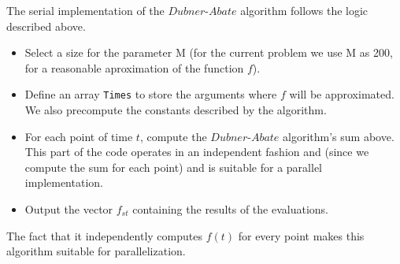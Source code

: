 The serial implementation of the $Dubner$-$Abate$ algorithm follows the logic described above.
\begin{itemize}
\item{Select a size for the parameter M (for the current problem we use M as 200, for a reasonable aproximation of the function $f$).}
\item{Define an array \texttt{Times} to store the arguments where $f$ will be approximated. We also precompute the constants described by the algorithm.}
\item{For each point of time $t$, compute the $Dubner$-$Abate$ algorithm's sum above.
This part of the code operates in an independent fashion and (since we compute the sum for each point) and is suitable for a parallel implementation.}
\item{Output the vector $f_{st}$ containing the results of the evaluations.}
\end{itemize}
The fact that it independently computes $f(t)$  for every point makes this algorithm suitable for parallelization.

